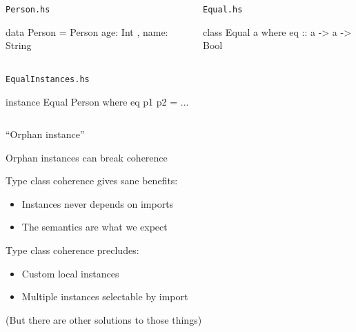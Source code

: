 \documentclass[usenames,dvipsnames,svgnames,table,aspectratio=169,mathserif]{beamer}
\newcommand{\nl}{\vspace{\baselineskip}}
\newcommand{\pnl}{\pause \nl}
\begin{document}
\begin{frame}[fragile]

\begin{columns}
\begin{column}[T]{0.49\textwidth}
\begin{block}{\tt Person.hs}
\begin{haskellcode}
data Person = Person
  { age: Int
  , name: String }
\end{haskellcode}
\end{block}
\end{column}
\begin{column}{0.02\textwidth}
\end{column}
\begin{column}[T]{0.49\textwidth}
\begin{block}{\tt Equal.hs}
\begin{haskellcode}
class Equal a where
  eq :: a -> a -> Bool
\end{haskellcode}
\end{block}
\end{column}
\end{columns}

\begin{columns}
\begin{column}{0.5\textwidth}
\begin{block}{\tt EqualInstances.hs}
\begin{haskellcode}
instance Equal Person where
  eq p1 p2 = ...
\end{haskellcode}
\end{block}
\end{column}
\end{columns}
\pause
\begin{center}
``Orphan instance''

Orphan instances can break coherence
\end{center}

\end{frame}


\begin{frame}
Type class coherence gives sane benefits:

\begin{itemize}
\item Instances never depends on imports
\item The semantics are what we expect
\end{itemize}

\pnl

Type class coherence precludes:

\begin{itemize}
\item Custom local instances
\item Multiple instances selectable by import
\end{itemize}

(But there are other solutions to those things)
\end{frame}
\end{document}
